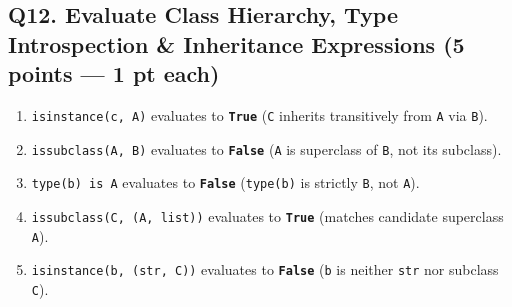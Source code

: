 \documentclass[11pt,a4paper]{article}
\begin{document}
\subsection*{Q12. Evaluate Class Hierarchy, Type Introspection \& Inheritance Expressions (5 points --- 1 pt each)}
\begin{enumerate}[label=\alph*),itemsep=1.0pt]
\item \lstinline|isinstance(c, A)| evaluates to \textbf{\texttt{True}} (\texttt{C} inherits transitively from \texttt{A} via \texttt{B}).
\item \lstinline|issubclass(A, B)| evaluates to \textbf{\texttt{False}} (\texttt{A} is superclass of \texttt{B}, not its subclass).
\item \lstinline|type(b) is A| evaluates to \textbf{\texttt{False}} (\texttt{type(b)} is strictly \texttt{B}, not \texttt{A}).
\item \lstinline|issubclass(C, (A, list))| evaluates to \textbf{\texttt{True}} (matches candidate superclass \texttt{A}).
\item \lstinline|isinstance(b, (str, C))| evaluates to \textbf{\texttt{False}} (\texttt{b} is neither \texttt{str} nor subclass \texttt{C}).
\end{enumerate}
\end{document}
